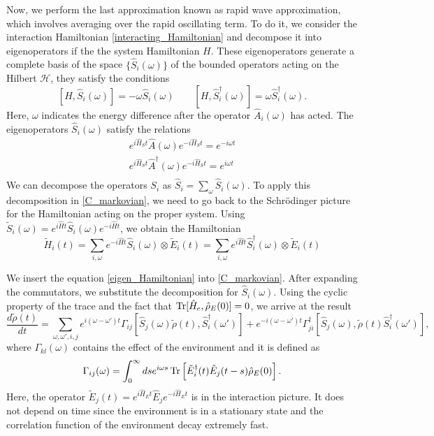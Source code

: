 Now, we perform the last approximation known as rapid wave approximation, which involves averaging over the rapid oscillating term. To do it, we consider the interaction Hamiltonian \eqref{interacting_Hamiltonian} and decompose it into eigenoperators if the the system Hamiltonian $H$.
These eigenoperators generate a complete basis of the space $\{\hat S_i(\omega)\}$ of the bounded operators acting on the Hilbert $\mathcal{H}$, they satisfy the conditions
\begin{equation}
    \left[H,\hat S_i(\omega)\right] = -\omega \hat S_i(\omega) \qquad \left[H,\hat S_i^\dagger(\omega)\right] = \omega \hat S_i^\dagger(\omega).
\end{equation}
Here, $\omega$ indicates the energy difference after the operator $\hat A_i(\omega)$ has acted.
The eigenoperators $\hat S_i(\omega)$ satisfy the relations
\begin{equation}
    \begin{split}
        e^{i\hat H_St}\hat A(\omega)e^{-i\hat H_St} = e^{-i\omega t}\\
        e^{i\hat H_St}\hat A^\dagger(\omega)e^{-i\hat H_St} = e^{i\omega t}\\
    \end{split}
\end{equation}
We can decompose the operators $S_i$ as $\hat S_i = \sum_\omega \hat S_i(\omega)$.
To apply this decomposition in \eqref{C_markovian}, we need to go back to the Schrödinger picture for the Hamiltonian acting on the proper system. Using $\tilde S_i(\omega)=e^{i\hat Ht}\hat S_i(\omega)e^{-i\hat H t}$, we obtain the Hamiltonian
\begin{equation}\label{eigen_Hamiltonian}
    \tilde H_i(t) = \sum_{i,\omega} e^{-i\hat Ht}\hat S_i(\omega) \otimes \tilde E_i (t)= \sum_{i,\omega} e^{i\hat Ht}\hat S_i^\dagger(\omega) \otimes \tilde E_i (t)
\end{equation}

We insert the equation \eqref{eigen_Hamiltonian} into \eqref{C_markovian}.
After expanding the commutators, we substitute the decomposition for $\hat S_i(\omega)$. Using the cyclic property of the trace and the fact that $\operatorname{Tr}[\hat H_e,\hat\rho_E(0)]=0$, we arrive at the result
\begin{equation}\label{c_substitue}
    \frac{d\tilde\rho(t)}{dt} = \sum_{\omega,\omega',i,j}e^{i(\omega-\omega')t}\Gamma_{ij}\left[\hat S_j(\omega)\tilde\rho(t),\hat S_i^\dagger(\omega')\right]+ e^{-i(\omega-\omega')t}\Gamma_{ji}^\dagger\left[\hat S_j(\omega),\tilde\rho(t)\hat S_i^\dagger(\omega')\right],
\end{equation}
where $\Gamma_{kl}(\omega)$ contains the effect of the environment and it is defined as
\begin{equation}\label{environment_coefficients}
    \Gamma_{ij}(\omega) = \int_{0}^{\infty}ds e^{i\omega s}\operatorname{Tr}\left[\tilde E_i^\dagger(t)\tilde E_j(t-s)\hat\rho_E(0)\right].
\end{equation}
Here, the operator $\tilde E_j(t)=e^{i\hat H_E t}\hat E_j e^{-i\hat H_E t}$ is in the interaction picture. It does not depend on time since the environment is in a stationary state and the correlation function of the environment decay extremely fast.

